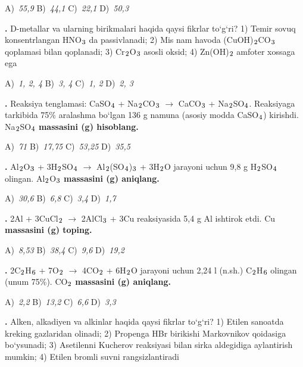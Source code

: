 \documentclass[11pt,a4paper]{article}
\renewcommand{\textsubscript}[1]{\ensuremath{_{\text{\fontsize{8}{8}\selectfont #1}}}}
\newcommand{\qn}[1]{\textbf{\fontsize{11.5}{13}\selectfont #1}}
\newcommand{\qsep}{\par\vspace{1pt}\noindent\rule{0pt}{0.4pt}\par\vspace{5pt}}
\begin{document}
\begin{multicols}{2}
\noindent A)~\textsl{55,9} \hfill B)~\textsl{44,1} \hfill C)~\textsl{22,1} \hfill D)~\textsl{50,3}\par
\qsep
\noindent\qn{16.} D-metallar va ularning birikmalari haqida qaysi fikrlar to`g`ri? 1) Temir sovuq konsentrlangan HNO\textsubscript{3} da passivlanadi; 2) Mis nam havoda (CuOH)\textsubscript{2}CO\textsubscript{3} qoplamasi bilan qoplanadi; 3) Cr\textsubscript{2}O\textsubscript{3} asosli oksid; 4) Zn(OH)\textsubscript{2} amfoter xossaga ega

\noindent A)~\textsl{1, 2, 4} \hfill B)~\textsl{3, 4} \hfill C)~\textsl{1, 2} \hfill D)~\textsl{2, 3}\par
\qsep
\noindent\qn{17.} Reaksiya tenglamasi: CaSO\textsubscript{4} + Na\textsubscript{2}CO\textsubscript{3} $\to$ CaCO\textsubscript{3} + Na\textsubscript{2}SO\textsubscript{4}. Reaksiyaga tarkibida 75\% aralashma bo`lgan 136 g namuna (asosiy modda CaSO\textsubscript{4}) kirishdi. Na\textsubscript{2}SO\textsubscript{4} \textbf{massasini (g) hisoblang.}

\noindent A)~\textsl{71} \hfill B)~\textsl{17,75} \hfill C)~\textsl{53,25} \hfill D)~\textsl{35,5}\par
\qsep
\noindent\qn{18.} Al\textsubscript{2}O\textsubscript{3} + 3H\textsubscript{2}SO\textsubscript{4} $\to$ Al\textsubscript{2}(SO\textsubscript{4})\textsubscript{3} + 3H\textsubscript{2}O jarayoni uchun 9,8 g H\textsubscript{2}SO\textsubscript{4} olingan. Al\textsubscript{2}O\textsubscript{3} \textbf{massasini (g) aniqlang.}

\noindent A)~\textsl{30,6} \hfill B)~\textsl{6,8} \hfill C)~\textsl{3,4} \hfill D)~\textsl{1,7}\par
\qsep
\noindent\qn{19.} 2Al + 3CuCl\textsubscript{2} $\to$ 2AlCl\textsubscript{3} + 3Cu reaksiyasida 5,4 g Al ishtirok etdi. Cu \textbf{massasini (g) toping.}

\noindent A)~\textsl{8,53} \hfill B)~\textsl{38,4} \hfill C)~\textsl{9,6} \hfill D)~\textsl{19,2}\par
\qsep
\noindent\qn{20.} 2C\textsubscript{2}H\textsubscript{6} + 7O\textsubscript{2} $\to$ 4CO\textsubscript{2} + 6H\textsubscript{2}O jarayoni uchun 2,24 l (n.sh.) C\textsubscript{2}H\textsubscript{6} olingan (unum 75\%). CO\textsubscript{2} \textbf{massasini (g) aniqlang.}

\noindent A)~\textsl{2,2} \hfill B)~\textsl{13,2} \hfill C)~\textsl{6,6} \hfill D)~\textsl{3,3}\par
\qsep
\noindent\qn{21.} Alken, alkadiyen va alkinlar haqida qaysi fikrlar to`g`ri? 1) Etilen sanoatda kreking gazlaridan olinadi; 2) Propenga HBr birikishi Markovnikov qoidasiga bo`ysunadi; 3) Asetilenni Kucherov reaksiyasi bilan sirka aldegidiga aylantirish mumkin; 4) Etilen bromli suvni rangsizlantiradi


\end{multicols}
\end{document}
